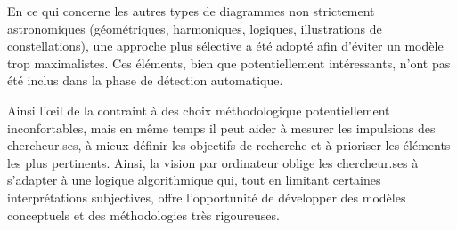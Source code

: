 En ce qui concerne les autres types de diagrammes non strictement
astronomiques (géométriques, harmoniques, logiques, illustrations de
constellations), une approche plus sélective a été adopté afin d'éviter
un modèle trop maximalistes. Ces éléments, bien que potentiellement
intéressants, n'ont pas été inclus dans la phase de détection
automatique.

Ainsi l'œil de la \cv contraint à des choix méthodologique
potentiellement inconfortables, mais en même temps il peut aider à
mesurer les impulsions des chercheur.ses, à mieux définir les objectifs de
recherche et à prioriser les éléments les plus pertinents. Ainsi, la
vision par ordinateur oblige les chercheur.ses à s'adapter à une logique
algorithmique qui, tout en limitant certaines interprétations
subjectives, offre l'opportunité de développer des modèles conceptuels et des méthodologies très rigoureuses.